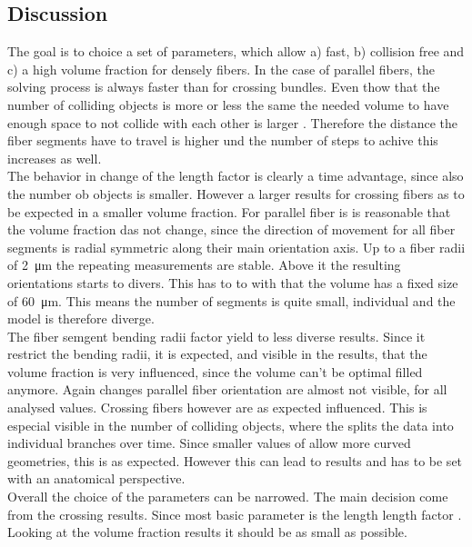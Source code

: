 \subsection{Discussion}
% 
The goal is to choice a set of parameters, which allow a) fast, b) collision free and c) a high volume fraction for densely fibers.
In the case of parallel fibers, the solving process is always faster than for crossing bundles.
Even thow that the number of colliding objects is more or less \dummy{} the same  the needed volume to have enough space to not collide with each other is larger \dummy{}.
Therefore the distance the fiber segments have to travel is higher und the number of steps to achive this increases as well.
\\
% 
The behavior in change of the length factor \segLengthFactor{} is clearly a time advantage, since also the number ob objects is smaller.
However a larger \segLengthFactor{} results for crossing fibers as to be expected in a smaller volume fraction.
For parallel fiber is is reasonable that the volume fraction das not change, since the direction of movement for all fiber segments is radial symmetric along their main orientation axis.
Up to a fiber radii of \SI{2}{\micro\meter} the repeating measurements are stable.
Above it the resulting orientations starts to divers.
This has to to with that the volume has a fixed size of \SI{60}{\micro\meter}.
This means the number of segments is quite small, individual and the model is therefore diverge.
\\
The fiber semgent bending radii factor \segRadiusFactor{} yield to less diverse results.
Since it restrict the bending radii, it is expected, and visible in the results, that the volume fraction is very influenced, since the volume can't be optimal filled anymore.
Again changes parallel fiber orientation are almost not visible, for all analysed values.
Crossing fibers however are as expected influenced.
This is especial visible in the number of colliding objects, where the \segRadiusFactor{} splits the data into individual branches over time.
Since smaller values of \segRadiusFactor{} allow more curved geometries, this is as expected.
However this can lead to  results and has to be set with an anatomical perspective. 
\\[\baselineskip]
% 
Overall the choice of the parameters can be narrowed.
The main decision come from the crossing results.
Since most basic parameter is the length length factor \segLengthFactor{}.
Looking at the volume fraction results it should be as small as possible.
